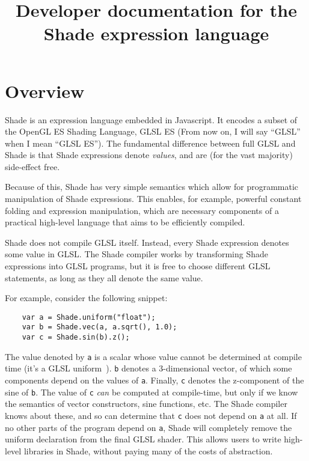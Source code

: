 \documentclass{article}
\title{Developer documentation for the Shade expression language}
\begin{document}
\maketitle
\newcommand{\C}[1]{\texttt{#1}}
\newcommand{\true}{\textrm{true}}
\newcommand{\false}{\textrm{false}}
\newcommand{\implies}{\Rightarrow}
\newcommand{\const}[1]{\textrm{Const}[#1]}
\newcommand{\val}[1]{\textrm{Value}[#1]}
\newcommand{\unk}{\textrm{unknown}}
\newcommand{\elt}[2]{\textrm{Element}[#1, #2]}
\newcommand{\glf}[1]{\textrm{float}(#1)}
\newcommand{\glvII}[2]{\textrm{vec3}(#1, #2)}
\newcommand{\glvIII}[3]{\textrm{vec4}(#1, #2, #3)}
\newcommand{\glvIV}[4]{\textrm{vec4}(#1, #2, #3, #4)}
\newcommand{\case}[1]{\textrm{case} #1 \textrm{of:}}

\section{Overview}

Shade is an expression language embedded in Javascript. It encodes a
subset of the OpenGL ES Shading Language, GLSL ES (From now on, I will
say ``GLSL'' when I mean ``GLSL ES''). The fundamental difference between
full GLSL and Shade is that Shade expressions denote \emph{values}, and are
(for the vast majority) side-effect free.

Because of this, Shade has very simple semantics which allow for
programmatic manipulation of Shade expressions. This enables, for
example, powerful constant folding and expression manipulation, which
are necessary components of a practical high-level language that aims
to be efficiently compiled.

Shade does not compile GLSL itself. Instead, every Shade expression
denotes some value in GLSL. The Shade compiler works by transforming
Shade expressions into GLSL programs, but it is free to choose
different GLSL statements, as long as they all denote the same value.

For example, consider the following snippet:
\begin{verbatim}
    var a = Shade.uniform("float");
    var b = Shade.vec(a, a.sqrt(), 1.0);
    var c = Shade.sin(b).z();
\end{verbatim}

The value denoted by \C{a} is a scalar whose value cannot be
determined at compile time (it's a GLSL
uniform~\cite{glslspec}). \C{b} denotes a 3-dimensional vector, of
which some components depend on the values of \C{a}.  Finally, \C{c}
denotes the z-component of the sine of \C{b}. The value of \C{c}
\emph{can} be computed at compile-time, but only if we know the
semantics of vector constructors, sine functions, etc. The Shade
compiler knows about these, and so can determine that \C{c} does not
depend on \C{a} at all. If no other parts of the program depend on
\C{a}, Shade will completely remove the uniform declaration from the
final GLSL shader.  This allows users to write high-level libraries in
Shade, without paying many of the costs of abstraction.
\end{document}
